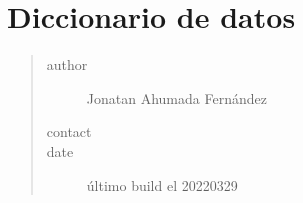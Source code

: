 \documentclass[letterpaper,10pt,spanish]{sphinxmanual}
\begin{document}
\chapter{Diccionario de datos}
\label{\detokenize{requerimientos/diccionario_datos:diccionario-de-datos}}\label{\detokenize{requerimientos/diccionario_datos::doc}}\begin{quote}\begin{description}
\item[{author}] \leavevmode
Jonatan Ahumada Fernández

\item[{contact}] \leavevmode
{}

\item[{date}] \leavevmode
último build el 2022\sphinxhyphen{}03\sphinxhyphen{}29

\end{description}\end{quote}
\end{document}
